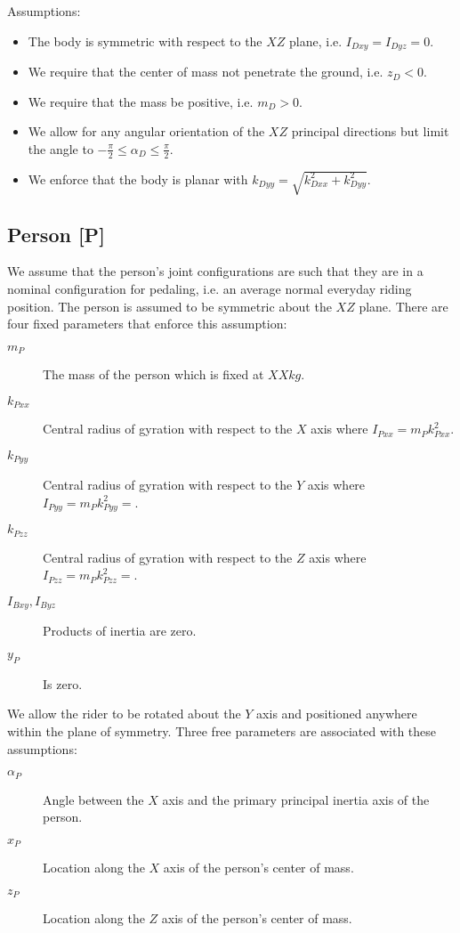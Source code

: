 \documentclass{article}
\begin{document}
Assumptions:

\begin{itemize}
  \item The body is symmetric with respect to the $XZ$ plane, i.e. $I_{Dxy} =
    I_{Dyz} = 0$.
  \item We require that the center of mass not penetrate the ground, i.e. $z_D
    < 0$.
  \item We require that the mass be positive, i.e. $m_D > 0$.
  \item We allow for any angular orientation of the $XZ$ principal directions
    but limit the angle to $-\frac{\pi}{2} \leq \alpha_D \leq \frac{\pi}{2}$.
  \item We enforce that the body is planar with $k_{Dyy} = \sqrt{k_{Dxx}^2 +
    k_{Dyy}^2}$.
\end{itemize}

\subsection{Person [P]}

We assume that the person's joint configurations are such that they are in a
nominal configuration for pedaling, i.e. an average normal everyday riding
position. The person is assumed to be symmetric about the $XZ$ plane. There are
four fixed parameters that enforce this assumption:

\begin{description}
  \item[$m_P$] The mass of the person which is fixed at $XX \si{kg}$.
  \item[$k_{Pxx}$] Central radius of gyration with respect to the $X$ axis
    where $I_{Pxx} = m_P k_{Pxx}^2$.
  \item[$k_{Pyy}$] Central radius of gyration with respect to the $Y$ axis
    where $I_{Pyy} = m_P k_{Pyy}^2=$.
  \item[$k_{Pzz}$] Central radius of gyration with respect to the $Z$ axis
    where $I_{Pzz} = m_P k_{Pzz}^2=$.
  \item[$I_{Bxy}, I_{Byz}$] Products of inertia are zero.
  \item[$y_P$] Is zero.
\end{description}

We allow the rider to be rotated about the $Y$ axis and positioned anywhere
within the plane of symmetry. Three free parameters are associated with these
assumptions:

\begin{description}
  \item[$\alpha_P$] Angle between the $X$ axis and the primary principal
    inertia axis of the person.
  \item[$x_P$] Location along the $X$ axis of the person's center of mass.
  \item[$z_P$] Location along the $Z$ axis of the person's center of mass.
\end{description}
\end{document}
